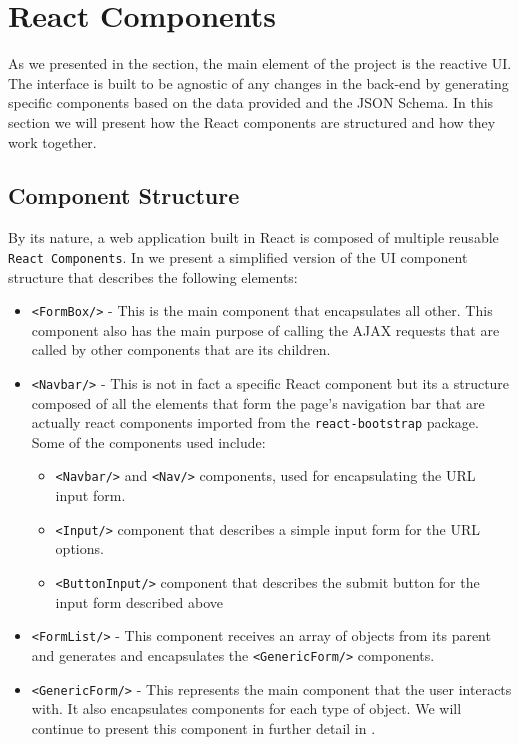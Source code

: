 \section{React Components}
\label{sec:react-components}

As we presented in the  section, the main element of the project is the reactive UI. The interface is built to be agnostic of any changes in the back-end by generating specific components based on the data provided and the JSON Schema. In this section we will present how the React components are structured and how they work together.

\subsection{Component Structure}
\label{sub-sec:component-structure}

By its nature, a web application built in React is composed of multiple reusable \texttt{React Components}. In  we present a simplified version of the UI component structure that describes the following elements:


\begin{itemize}
	\item \texttt{<FormBox/>} - This is the main component that encapsulates all other. This component also has the main purpose of calling the AJAX requests that are called by other components that are its children.
	\item \texttt{<Navbar/>} - This is not in fact a specific React component but its a structure composed of all the elements that form the page's navigation bar that are actually react components imported from the \texttt{react-bootstrap} package. Some of the components used include:
	  \begin{itemize}
	  	\item \texttt{<Navbar/>} and \texttt{<Nav/>} components, used for encapsulating the URL input form.
	  	\item \texttt{<Input/>} component that describes a simple input form for the URL options.
	  	\item \texttt{<ButtonInput/>} component that describes the submit button for the input form described above
	  \end{itemize}
	\item \texttt{<FormList/>} - This component receives an array of objects from its parent and generates and encapsulates the \texttt{<GenericForm/>} components.
	\item \texttt{<GenericForm/>} - This represents the main component that the user interacts with. It also encapsulates components for each type of object. We will continue to present this component in further detail in  .
\end{itemize}


